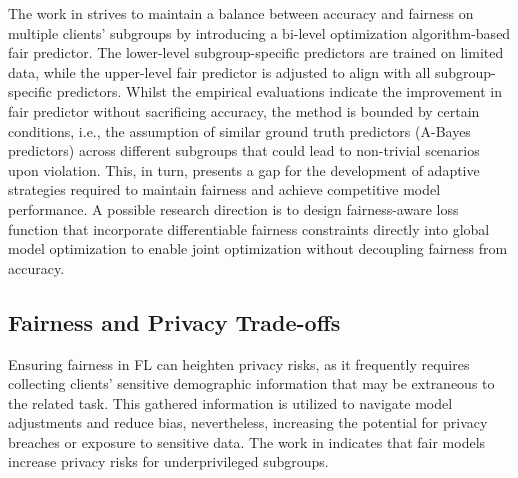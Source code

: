 \documentclass{article}
\begin{document}
The work in \cite{Changjian} strives to maintain a balance between accuracy and fairness on multiple clients' subgroups by introducing a bi-level optimization algorithm-based fair predictor. The lower-level subgroup-specific predictors are trained on limited data, while the upper-level fair predictor is adjusted to align with all subgroup-specific predictors. Whilst the empirical evaluations indicate the improvement in fair predictor without sacrificing accuracy, the method is bounded by certain conditions, i.e., the assumption of similar ground truth predictors (A-Bayes predictors) across different subgroups that could lead to non-trivial scenarios upon violation. This, in turn, presents a gap for the development of adaptive strategies required to maintain fairness and achieve competitive model performance. A possible research direction is to design fairness-aware loss function that incorporate differentiable fairness constraints directly into global model optimization to enable joint optimization without decoupling fairness from accuracy.
 
\subsection{Fairness and Privacy Trade-offs}
\label{SubSec: Fairness and Privacy Tradeoffs}
Ensuring fairness in FL can heighten privacy risks, as it frequently requires collecting clients' sensitive demographic information that may be extraneous to the related task. This gathered information is utilized to navigate model adjustments and reduce bias, nevertheless, increasing the potential for privacy breaches or exposure to sensitive data. The work in \cite{chang2021privacy} indicates that fair models increase privacy risks for underprivileged subgroups.
\end{document}

